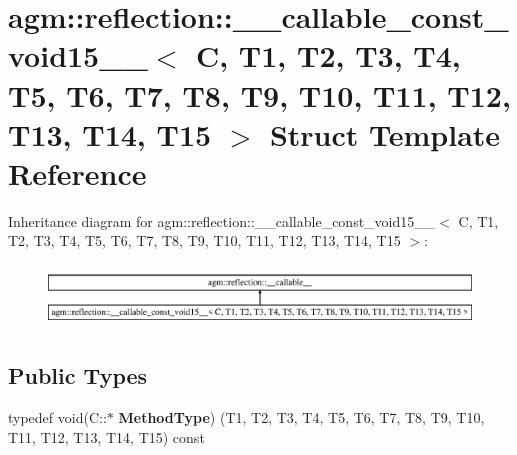 \hypertarget{structagm_1_1reflection_1_1____callable__const__void15____}{}\section{agm\+:\+:reflection\+:\+:\+\_\+\+\_\+callable\+\_\+const\+\_\+void15\+\_\+\+\_\+$<$ C, T1, T2, T3, T4, T5, T6, T7, T8, T9, T10, T11, T12, T13, T14, T15 $>$ Struct Template Reference}
\label{structagm_1_1reflection_1_1____callable__const__void15____}
Inheritance diagram for agm\+:\+:reflection\+:\+:\+\_\+\+\_\+callable\+\_\+const\+\_\+void15\+\_\+\+\_\+$<$ C, T1, T2, T3, T4, T5, T6, T7, T8, T9, T10, T11, T12, T13, T14, T15 $>$\+:\begin{figure}[H]
\begin{center}
\leavevmode
\includegraphics[height=1.642229cm]{structagm_1_1reflection_1_1____callable__const__void15____}
\end{center}
\end{figure}
\subsection*{Public Types}
\begin{DoxyCompactItemize}
\item 
typedef void(C\+::$\ast$ {\bfseries Method\+Type}) (T1, T2, T3, T4, T5, T6, T7, T8, T9, T10, T11, T12, T13, T14, T15) const \hypertarget{structagm_1_1reflection_1_1____callable__const__void15_____ac278817940a80f5698fe06a873fea2da}{}\label{structagm_1_1reflection_1_1____callable__const__void15_____ac278817940a80f5698fe06a873fea2da}

\end{DoxyCompactItemize}
